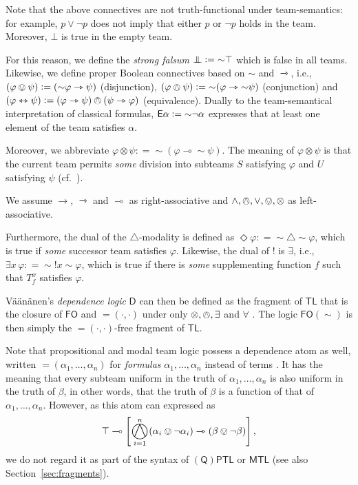 \documentclass[a4paper,english,fleqn,11pt,final]{scrartcl}
\makeatletter
\newcommand{\ie}{i.e.\@\xspace}
\newcommand{\logicOpFont}[1]{\mathsf{#1}}
\newcommand{\negg}{{\sim}}
\newcommand{\depop}{{=\!\!(\cdot,\cdot)}}
\newcommand{\dep}[1]{{=\!\!(#1)}}
\newcommand{\logic}[1]{\ensuremath{\mathsf{#1}}\xspace}
\newcommand{\D}{\logic{D}}
\newcommand{\FO}{\logic{FO}}
\newcommand{\QPPTL}{\logic{(Q)PTL}}
\newcommand{\MTL}{\logic{MTL}}
\newcommand{\TL}{\logic{TL}}
\newcommand{\E}{\protect\ensuremath\logicOpFont{E}}
\providecommand{\dfn}{\mathrel{\mathop:}=}
\newcommand{\imp}{\rightarrow}
\newcommand{\limp}{\multimap}
\newcommand{\timp}{\rightarrowtriangle}
\newcommand{\tequiv}{\leftrightarrowtriangle}
\newcommand{\tens}{\otimes}
\newcommand{\oland}{\owedge}
\DeclareMathOperator*{\bigoland}{\scalerel*{\owedge}{\sum}}
\DeclareMathOperator{\shriek}{!}
\newcommand{\falsum}{\mathrlap{\,\bot}\bot\,}
\theoremstyle{plain}
\theoremstyle{definition}
\makeatother
\begin{document}
Note that the above connectives are not truth-functional under team-semantics:
for example, $p \lor \neg p$ does not imply that either $p$ or $\neg p$ holds in the team.
Moreover, $\bot$ is true in the empty team.

For this reason, we define the \emph{strong falsum} $\falsum \dfn \negg \top$ which is false in all teams.
Likewise, we define proper Boolean connectives based on $\negg$ and $\timp$, \ie, $(\varphi \ovee \psi) \dfn (\negg\varphi\timp\psi)$ (disjunction), $(\varphi \owedge \psi) \dfn \negg(\varphi \timp \negg\psi)$ (conjunction) and $(\varphi \tequiv \psi) \dfn (\varphi \timp \psi) \owedge (\psi \timp \varphi)$ (equivalence).
Dually to the team-semantical interpretation of classical formulas, $\E\alpha \dfn \negg \neg \alpha$ expresses that at least one element of the team satisfies $\alpha$.

Moreover, we abbreviate $\varphi \tens \psi \dfn \negg(\varphi \limp \negg\psi)$.
The meaning of $\varphi \tens \psi$ is that the current team permits \emph{some} division into subteams $S$ satisfying $\varphi$ and $U$ satisfying $\psi$ (cf.\ \cite{vaananen_dependence_2007,yang_propositional_2017}).

We assume $\imp$, $\timp$ and $\limp$ as right-associative and $\land, \owedge, \lor, \ovee, \tens$ as left-associative.

Furthermore, the dual of the $\triangle$-modality is defined as $\Diamond\varphi\dfn\negg \triangle \negg \varphi$, which is true if \emph{some} successor team satisfies $\varphi$.
Likewise, the dual of $\shriek$ is $\exists$, \ie, $\exists x \, \varphi \dfn \negg \shriek x \negg \varphi$, which is true if there is \emph{some} supplementing function $f$ such that $T^x_f$ satisfies $\varphi$.




\smallskip

Väänänen's \emph{dependence logic} $\D$ can then be defined as the fragment of $\TL$ that is the closure of $\FO$ and $\depop$ under only $\tens,\oland,\exists$ and $\forall$ \cite{vaananen_dependence_2007}.
The logic $\FO(\negg)$ is then simply the $\depop$-free fragment of $\TL$.

\smallskip

Note that propositional and modal team logic possess a dependence atom as well, written $\dep{\alpha_1,\ldots,\alpha_n}$ for \emph{formulas} $\alpha_1,\ldots,\alpha_n$ instead of terms \cite{yang_propositional_2016,emdl,vaananen_modal_2008}.
It has the meaning that every subteam uniform in the truth of $\alpha_1,\ldots,\alpha_n$ is also uniform in the truth of $\beta$, in other words, that the truth of $\beta$ is a function of that of $\alpha_1,\ldots,\alpha_n$.
However, as this atom can expressed as
\[
\top \limp \left[\bigoland_{i=1}^n(\alpha_i \ovee \neg \alpha_i) \timp (\beta \ovee \neg \beta)\right]\text{,}
\]
we do not regard it as part of the syntax of $\QPPTL$ or $\MTL$ (see also Section~\ref{sec:fragments}).
\end{document}
